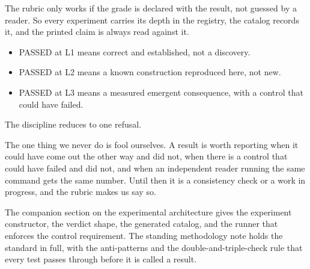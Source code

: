 The rubric only works if the grade is declared with the result, not guessed by a reader. So every experiment carries its depth in the registry, the catalog records it, and the printed claim is always read against it.

\begin{itemize}
\item PASSED at L1 means correct and established, not a discovery.
\item PASSED at L2 means a known construction reproduced here, not new.
\item PASSED at L3 means a measured emergent consequence, with a control that could have failed.
\end{itemize}

The discipline reduces to one refusal.

\begin{principle}
The one thing we never do is fool ourselves. A result is worth reporting when it could have come out the other way and did not, when there is a control that could have failed and did not, and when an independent reader running the same command gets the same number. Until then it is a consistency check or a work in progress, and the rubric makes us say so.
\end{principle}

The companion section on the experimental architecture gives the experiment constructor, the verdict shape, the generated catalog, and the runner that enforces the control requirement. The standing methodology note holds the standard in full, with the anti-patterns and the double-and-triple-check rule that every test passes through before it is called a result.
